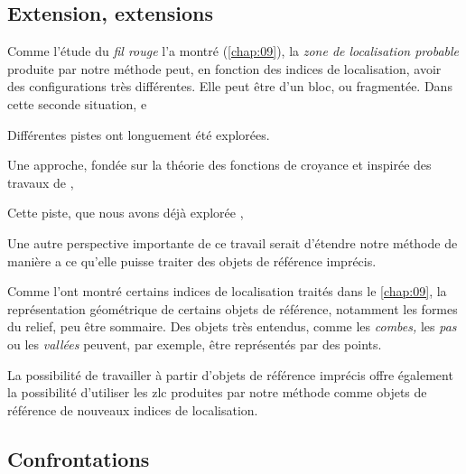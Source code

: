 \subsection*{Extension, extensions}


Comme l'étude du \emph{fil rouge} l'a montré (\autoref{chap:09}), la
\emph{zone de localisation probable} produite par notre méthode peut,
en fonction des indices de localisation, avoir des configurations très
différentes. Elle peut être d'un bloc, ou fragmentée. Dans cette
seconde situation,  e


Différentes pistes ont longuement été explorées.

Une approche, fondée sur la théorie des fonctions de croyance
\autocite{Shafer1976} et inspirée des travaux de
\textcite{Olteanu2008},



Cette piste, que nous avons déjà explorée \autocite{Bunel2019a},





Une autre perspective importante de ce travail serait d'étendre notre
méthode de manière a ce qu'elle puisse traiter des objets de référence
imprécis.

Comme l'ont montré certains indices de localisation traités dans le
\autoref{chap:09}, la représentation géométrique de certains objets de
référence, notamment les formes du relief, peu être sommaire. Des
objets très entendus, comme les \emph{combes,} les \emph{pas} ou les
\emph{vallées} peuvent, par exemple, être représentés par des points.


La possibilité de travailler à partir d'objets de référence imprécis
offre également la possibilité d'utiliser les \ac{zlc} produites par
notre méthode comme objets de référence de nouveaux indices de
localisation.


\subsection*{Confrontations}




